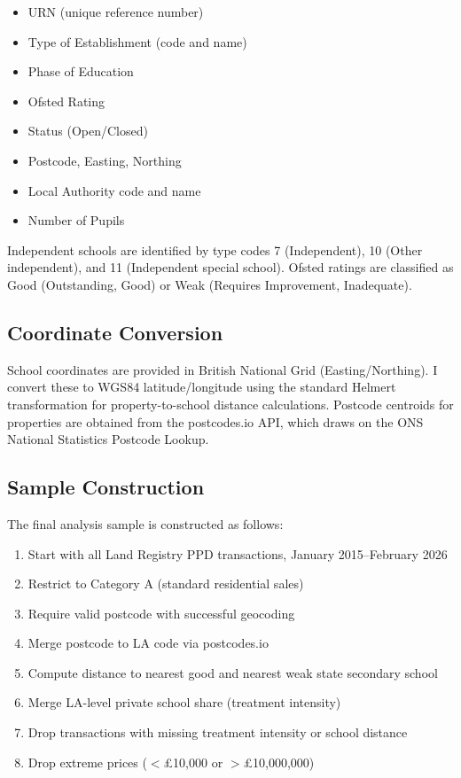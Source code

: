 \documentclass[12pt]{article}
\begin{document}
\begin{itemize}
    \item URN (unique reference number)
    \item Type of Establishment (code and name)
    \item Phase of Education
    \item Ofsted Rating
    \item Status (Open/Closed)
    \item Postcode, Easting, Northing
    \item Local Authority code and name
    \item Number of Pupils
\end{itemize}

Independent schools are identified by type codes 7 (Independent), 10 (Other independent), and 11 (Independent special school). Ofsted ratings are classified as Good (Outstanding, Good) or Weak (Requires Improvement, Inadequate).

\subsection{Coordinate Conversion}

School coordinates are provided in British National Grid (Easting/Northing). I convert these to WGS84 latitude/longitude using the standard Helmert transformation for property-to-school distance calculations. Postcode centroids for properties are obtained from the postcodes.io API, which draws on the ONS National Statistics Postcode Lookup.

\subsection{Sample Construction}

The final analysis sample is constructed as follows:

\begin{enumerate}
    \item Start with all Land Registry PPD transactions, January 2015--February 2026
    \item Restrict to Category A (standard residential sales)
    \item Require valid postcode with successful geocoding
    \item Merge postcode to LA code via postcodes.io
    \item Compute distance to nearest good and nearest weak state secondary school
    \item Merge LA-level private school share (treatment intensity)
    \item Drop transactions with missing treatment intensity or school distance
    \item Drop extreme prices ($<$\pounds 10,000 or $>$\pounds 10,000,000)
\end{enumerate}
\end{document}
